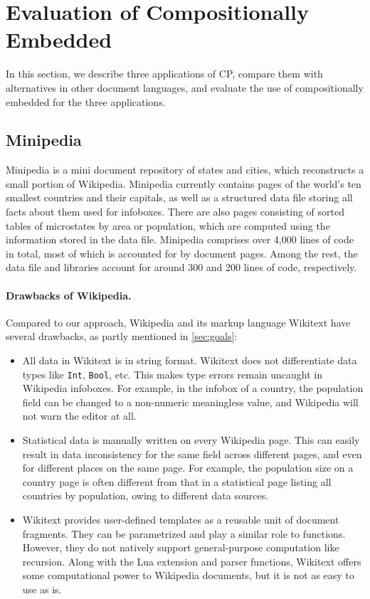 \section{Evaluation of Compositionally Embedded \ExT} \label{sec:evaluation}

In this section, we describe three applications of CP, compare them with
alternatives in other document languages, and evaluate the use of
compositionally embedded \ExT for the three applications.

\subsection{Minipedia} \label{sec:minipedia}

Minipedia is a mini document repository of states and cities, which reconstructs
a small portion of Wikipedia. Minipedia currently contains pages of the world's
ten smallest countries and their capitals, as well as a structured data file
storing all facts about them used for infoboxes. There are also pages consisting
of sorted tables of microstates by area or population, which are computed using
the information stored in the data file. Minipedia comprises over 4,000 lines of
code in total, most of which is accounted for by document pages. Among the rest,
the data file and \ExT libraries account for around 300 and 200 lines of code,
respectively.

\paragraph{Drawbacks of Wikipedia.}
Compared to our approach, Wikipedia and its markup language Wikitext have
several drawbacks, as partly mentioned in \autoref{sec:goals}:
\begin{itemize}
\item All data in Wikitext is in string format. Wikitext does not differentiate
      data types like \lstinline{Int}, \lstinline{Bool}, etc. This makes type
      errors remain uncaught in Wikipedia infoboxes. For example, in the infobox
      of a country, the population field can be changed to a non-numeric
      meaningless value, and Wikipedia will not warn the editor at all.
\item Statistical data is manually written on every Wikipedia page. This can
      easily result in data inconsistency for the same field across different
      pages, and even for different places on the same page. For example, the
      population size on a country page is often different from that in a
      statistical page listing all countries by population, owing to different
      data sources.
\item Wikitext provides user-defined templates as a reusable unit of document
      fragments. They can be parametrized and play a similar role to functions.
      However, they do not natively support general-purpose computation like
      recursion. Along with the Lua extension and parser functions, Wikitext
      offers some computational power to Wikipedia documents, but it is not as
      easy to use as \ExT is.
\end{itemize}


